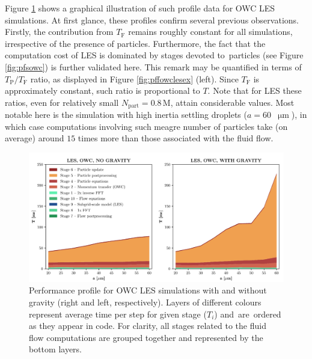 \documentclass{pracamgren}
\begin{document}
\medskip

Figure \ref{fig:pffowcles} shows a graphical illustration of such profile data for OWC LES simulations.
At first glance, these profiles confirm several previous observations.
Firstly, the contribution from $T_\text{F}$ remains roughly constant for all simulations, irrespective of the presence of particles.
Furthermore, the fact that the computation cost of LES is dominated by stages devoted to~particles (see Figure \ref{fig:pfsowc}) is further validated here.
This remark may be quantified in terms of $T_{\text{P}} / T_{\text{F}}$ ratio, as displayed in Figure \ref{fig:pffowclesex} (left).
Since $T_{\text{F}}$ is approximately constant, such ratio is proportional to $T$.
Note that for LES these ratios, even for relatively small $N_{\text{part}} = 0.8 \, \text{M}$, attain considerable values.
Most notable here is the simulation with high inertia settling droplets ($a = 60$~$\upmu\text{m}$), in which case computations involving such meagre number of particles take (on average) around $15$ times more than those associated with the fluid flow.

\begin{figure}[h]
\centering
\includegraphics[width=13.5cm]{img/plots/3-3a-pffowcles.pdf}
\caption{
Performance profile for OWC LES simulations with and without gravity (right and left, respectively).
Layers of different colours represent average time per step for given stage ($T_i$) and~are~ordered as they appear in code.
For clarity, all stages related to the fluid flow computations are grouped together and represented by the bottom layers.
}
\label{fig:pffowcles}
\end{figure}
\end{document}

